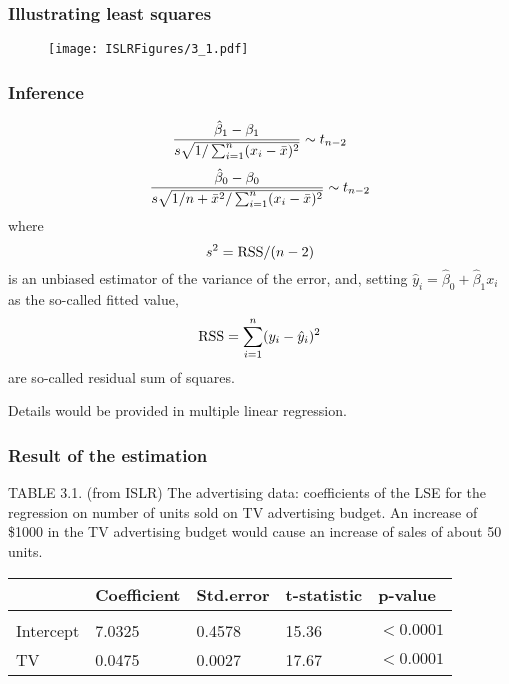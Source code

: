 \documentclass{beamer}
\begin{document}
        
        \begin{frame}
        	\frametitle{Illustrating least squares}
        	
        	\begin{figure}[h]
        		\centering
        		\texttt{[image: ISLRFigures/3\_1.pdf]}	 
        	\end{figure}	
        \end{frame}
        
        \begin{frame} 
        	\frametitle{Inference}
        	
        	$${ \hat \beta_1 - \beta_1 \over s \sqrt{ 1/ \sum_{i=1}^n (x_i -\bar x)^2} }  \sim t_{n-2}$$
        	$${\hat \beta_0 - \beta_0 \over s \sqrt{ 1/n + \bar x^2 / \sum_{i=1}^n (x_i -\bar x)^2} }  \sim t_{n-2}$$
        	where 
        	$$ s^2 = \hbox{RSS}/(n-2)$$
        	is an unbiased estimator of the variance of the error, 
        	and, setting $\hat y_i = \hat \beta_0 + \hat \beta_1 x_i$ as the so-called fitted value, 
        	$$ {\rm RSS} = \sum_{i=1}^n (y_i - \hat y_i)^2 $$
        	are so-called residual sum of squares.
        	
        	Details would be provided in multiple linear regression. 
        	
        \end{frame}
        
        
        \begin{frame} \frametitle{Result of the estimation}
        	TABLE 3.1. (from ISLR) The advertising data: coefficients of the LSE for the regression on 
        	number of units sold on TV advertising budget. An increase of \$1000 in the TV advertising budget 
        	would cause an increase of sales of about 50 units.
        	\begin{center}
        		\begin{adjustbox}{width=1\textwidth}
        			\small
        			\begin{tabular}{lllll} 
        				& Coefficient & Std.error & t-statistic &p-value  \\
        				\hline \\	
        				Intercept &7.0325 &0.4578& 15.36& $<0.0001$  \\
        				TV & 0.0475 &0.0027& 17.67& $<0.0001$\\		
        			\end{tabular}
        		\end{adjustbox} 
        	\end{center}
        \end{frame}	
      
\end{document}
